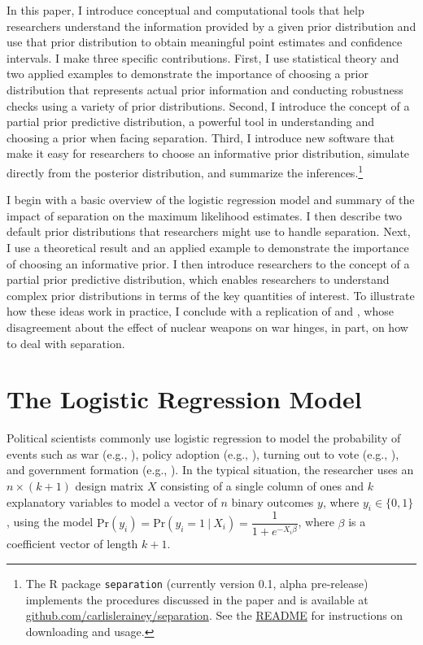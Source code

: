 \documentclass[12pt]{article}
\begin{document}
In this paper, I introduce conceptual and computational tools that help researchers understand the information provided by a given prior distribution and use that prior distribution to obtain meaningful point estimates and confidence intervals. 
I make three specific contributions. 
First, I use statistical theory and two applied examples to demonstrate the importance of choosing a prior distribution that represents actual prior information and conducting robustness checks using a variety of prior distributions. 
Second, I introduce the concept of a partial prior predictive distribution, a powerful tool in understanding and choosing a prior when facing separation. 
Third, I introduce new software that make it easy for researchers to choose an informative prior distribution, simulate directly from the posterior distribution, and summarize the inferences.\footnote{
The R package \texttt{separation} (currently version 0.1, alpha pre-release) implements the procedures discussed in the paper and is available at \href{https://github.com/carlislerainey/separation}{github.com/carlislerainey/separation}. 
See the \href{https://github.com/carlislerainey/separation/blob/master/README.md}{README} for instructions on downloading and usage.}

I begin with a basic overview of the logistic regression model and summary of the impact of separation on the maximum likelihood estimates. 
I then describe two default prior distributions that researchers might use to handle separation. 
Next, I use a theoretical result and an applied example to demonstrate the importance of choosing an informative prior. 
I then introduce researchers to the concept of a partial prior predictive distribution, which enables researchers to understand complex prior distributions in terms of the key quantities of interest. 
To illustrate how these ideas work in practice, I conclude with a replication of \cite{Rauchhaus2009} and \cite{BellMiller2015}, whose disagreement about the effect of nuclear weapons on war hinges, in part, on how to deal with separation.

\section*{The Logistic Regression Model}

Political scientists commonly use logistic regression to model the probability of events such as war (e.g., \citealt{Fearon1994}), policy adoption (e.g., \citealt{BerryBerry1990}), turning out to vote (e.g., \citealt{WolfingerRosenstone1980}), and government formation (e.g., \citealt{MartinStevenson2001}). 
In the typical situation, the researcher uses an $n \times (k + 1)$ design matrix $X$ consisting of a single column of ones and $k$ explanatory variables to model a vector of $n$ binary outcomes $y$, where $y_i \in \{0, 1\}$, using the model $\text{Pr}(y_i) = \text{Pr}(y_i = 1~|~ X_i) = \dfrac{1}{1 + e^{-X_i\beta}}$, where $\beta$ is a coefficient vector of length $k + 1$. 
\end{document}
